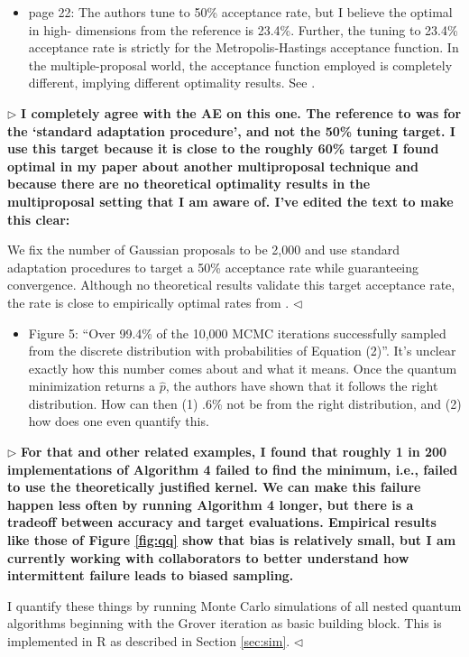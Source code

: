 \documentclass[12pt]{article}
\newenvironment{reply}{$\triangleright$\bfseries}{$\triangleleft$}
\renewenvironment{quote}
               {\list{}{\rightmargin\leftmargin}%
                \item\relax\normalfont}
               {\endlist}
\begin{document}
\begin{itemize}
	
	\item page 22: The authors tune to 50\% acceptance rate, but I believe the optimal in high- dimensions from the reference \citet{rosenthal2011optimal} is 23.4\%. Further, the tuning to 23.4\% acceptance rate is strictly for the Metropolis-Hastings acceptance function. In the multiple-proposal world, the acceptance function employed is completely different, implying different optimality results. See \citet{agrawal2021optimal}.
\end{itemize}

\begin{reply}
	I completely agree with the AE on this one.  The reference to \citet{rosenthal2011optimal} was for the `standard adaptation procedure', and not the 50\% tuning target.  I use this target because it is close to the roughly 60\% target I found optimal in my paper about another multiproposal technique \citep{holbrook2021generating} and because there are no theoretical optimality results in the multiproposal setting that I am aware of.  I've edited the text to make this clear:
	\begin{quote}
		We fix the number of Gaussian proposals to be 2,000 and use standard adaptation procedures \citep{rosenthal2011optimal} to target a 50\% acceptance rate while guaranteeing convergence. Although no theoretical results validate this target acceptance rate, the rate is close to empirically optimal rates from \citet{holbrook2021generating}.
	\end{quote}
\end{reply}

\begin{itemize}	
	
	\item Figure 5: ``Over 99.4\% of the 10,000 MCMC iterations successfully sampled from the discrete distribution with probabilities of Equation (2)''. It’s unclear exactly how this number comes about and what it means. Once the quantum minimization returns a $\hat{p}$, the authors have shown that it follows the right distribution. How can then (1) .6\% not be from the right distribution, and (2) how does one even quantify this.
\end{itemize}

\begin{reply}
For that and other related examples, I found that roughly 1 in 200 implementations of Algorithm 4 failed to find the minimum, i.e., failed to use the theoretically justified kernel.  We can make this failure happen less often by running Algorithm 4 longer, but there is a tradeoff between accuracy and target evaluations. Empirical results like those of Figure \ref{fig:qq} show that bias is relatively small, but I am currently working with collaborators to better understand how intermittent failure leads to biased sampling.  

I quantify these things by running Monte Carlo simulations of all nested quantum algorithms beginning with the Grover iteration as basic building block.  This is implemented in R as described in Section \ref{sec:sim}.
\end{reply}
\end{document}

